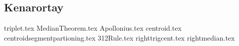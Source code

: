 \subsection{Kenarortay}
{triplet.tex}
\newpage
{MedianTheorem.tex}
\newpage
{Apollonius.tex}
\newpage
{centroid.tex}
\newpage
{centroidsegmentpartioning.tex}
\newpage
{312Rule.tex}
\newpage
{righttrigcent.tex}
\newpage
{rightmedian.tex}
\newpage